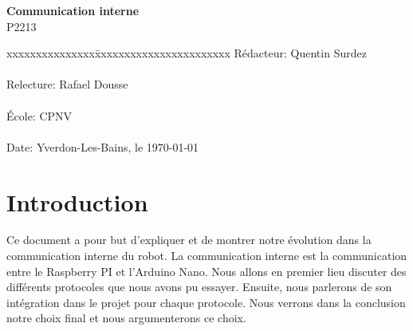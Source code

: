 \documentclass[
	a4paper,									%
	11pt,										%
	twoside,									%
	openright,									%
	notitlepage,									%
	parskip=half,								%
]{scrreprt}										%
\begin{document}
\begin{titlepage}
	\vspace{3cm}

	\fontsize{30pt}{32pt}\selectfont 
	\noindent \textbf{Communication interne} \\

	\fontsize{18pt}{20pt}\selectfont\vspace{0.3em} P2213 \\

	\vspace{4cm}
	\fontsize{12pt}{15pt}\selectfont
	\begin{tabbing}
		xxxxxxxxxxxxxxx\=xxxxxxxxxxxxxxxxxxxxxxx \kill
		Rédacteur:\> Quentin Surdez\\ \\
		Relecture:\> Rafael Dousse\\ \\
		École:\> CPNV\\ \\
		Date:\> Yverdon-Les-Bains, le \today \\
	\end{tabbing}
\end{titlepage}

\tableofcontents

\listoffigures									%
\cleardoublepage

\setcounter{page}{1}

\chapter{Introduction}
Ce document a pour but d'expliquer et de montrer notre évolution dans la communication interne du robot. 
La communication interne est la communication entre le Raspberry PI et l'Arduino Nano. 
Nous allons en premier lieu discuter des différents protocoles que nous avons pu essayer. Ensuite, nous parlerons
de son intégration dans le projet pour chaque protocole. Nous verrons dans la conclusion notre choix final et nous argumenterons ce choix. 
\end{document}
